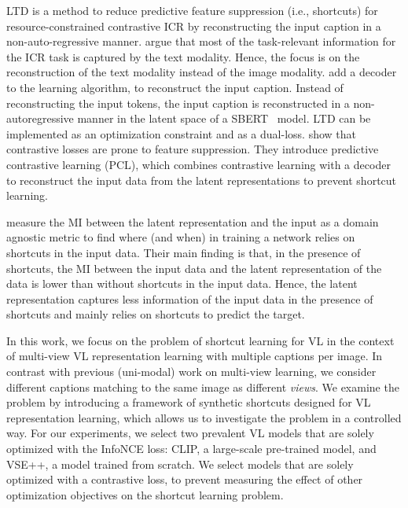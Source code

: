 \Acf{LTD} is a method to reduce predictive feature suppression (i.e.,  shortcuts) for resource-constrained contrastive \ac{ICR} by reconstructing the input caption in a non-auto-regressive manner.
\cite{bleeker2023reducing} argue that most of the task-relevant information for the \ac{ICR} task is captured by the text modality.
Hence, the focus is on the reconstruction of the text modality instead of the image modality.
\cite{bleeker2023reducing} add a decoder to the learning algorithm, to reconstruct the input caption.
Instead of reconstructing the input tokens, the input caption is reconstructed in a non-autoregressive manner in the latent space of a \acl{SBERT}~\citep{reimersers2019sentence, song2020mpnet} model.
\ac{LTD} can be implemented as an optimization constraint and as a dual-loss.
\cite{li2023addressing} show that contrastive losses are prone to feature suppression. 
They introduce predictive contrastive learning (PCL), which combines contrastive learning with a decoder to reconstruct the input data from the latent representations to prevent shortcut learning.

\cite{adnan2022monitoring}  measure the \ac{MI} between the latent representation and the input as a domain agnostic metric to find where (and when) in training a network relies on shortcuts in the input data. 
Their main finding is that, in the presence of shortcuts, the \ac{MI} between the input data and the latent representation of the data is lower than without shortcuts in the input data. 
Hence, the latent representation captures less information of the input data in the presence of shortcuts and mainly relies on shortcuts to predict the target.

In this work, we focus on the problem of shortcut learning for \ac{VL} in the context of multi-view \ac{VL} representation learning with multiple captions per image. 
In contrast with previous (uni-modal) work on multi-view learning, we consider different captions matching to the same image as different \textit{views}.
We examine the problem by introducing a framework of synthetic shortcuts designed for \ac{VL} representation learning, which allows us to investigate the problem in a controlled way.
For our experiments, we select two prevalent \ac{VL} models that are solely optimized with the InfoNCE loss: 
CLIP, a large-scale pre-trained model, and VSE++, a model trained from scratch.
We select models that are solely optimized with a contrastive loss, to prevent measuring the effect of other optimization objectives on the shortcut learning problem. 
